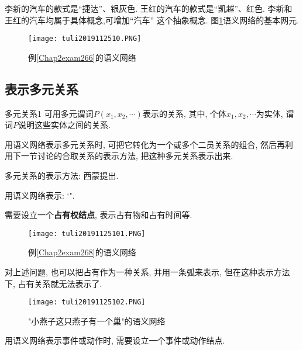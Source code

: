 \begin{example}\label{Chap2exam266}
李新的汽车的款式是“捷达”、银灰色.
王红的汽车的款式是“凯越”、红色.
李新和王红的汽车均属于具体概念,可增加“汽车” 这个抽象概念.
图\ref{AI32fig10}语义网络的基本网元.
\end{example}
\begin{figure}[htbp]
\centering
\texttt{[image: tuli2019112510.PNG]}
\caption{例\ref{Chap2exam266}的语义网络}
\label{AI32fig10}
\end{figure}
\subsection{表示多元关系}
\begin{mydef}{多元关系}{1}
可用多元谓词$P(x_1, x_2,\cdots)$表示的关系, 其中, 个体$x_1, x_2,\cdots$为实体, 谓词$P$说明这些实体之间的关系.
\end{mydef}

用语义网络表示多元关系时, 可把它转化为一个或多个二员关系的组合, 然后再利用下一节讨论的合取关系的表示方法, 把这种多元关系表示出来.

多元关系的表示方法: 西蒙提出.
\begin{example}\label{Chap2exam268}
用语义网络表示: `".
\end{example}
需要设立一个\textbf{占有权结点}, 表示占有物和占有时间等.
\begin{figure}[H]
\centering
\texttt{[image: tuli20191125101.PNG]}
\caption{例\ref{Chap2exam268}的语义网络}
\label{AI32fig101}
\end{figure}

对上述问题, 也可以把占有作为一种关系, 并用一条弧来表示, 但在这种表示方法下, 占有关系就无法表示了.
\begin{figure}[H]
\centering
\texttt{[image: tuli20191125102.PNG]}
\caption{"小燕子这只燕子有一个巢"的语义网络}
\label{AI32fig102}
\end{figure}
用语义网络表示事件或动作时, 需要设立一个事件或动作结点.

